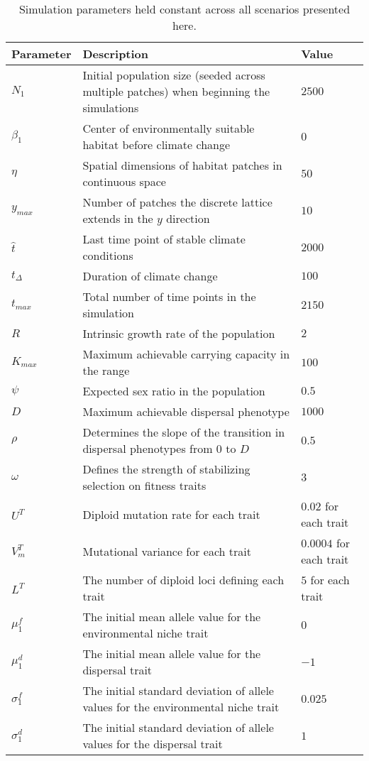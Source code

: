 \documentclass[11pt, oneside]{article}
\begin{document}
\begin{table}
\renewcommand{\arraystretch}{1.5}
  \begin{tabular}{ p{2cm} | p{8cm} | p{2cm} }
    \hline
    Parameter & Description & Value \\ \hline \hline
    $N_{1}$ & Initial population size (seeded across multiple patches) when beginning the simulations & $2500$ \\
    $\beta_{1}$ & Center of environmentally suitable habitat before climate change & $0$ \\
    $\eta$ & Spatial dimensions of habitat patches in continuous space & $50$ \\
    $y_{max}$ & Number of patches the discrete lattice extends in the $y$ direction & $10$ \\
    $\hat{t}$ & Last time point of stable climate conditions & $2000$ \\
    $t_{\Delta}$ & Duration of climate change & $100$ \\
    $t_{max}$ & Total number of time points in the simulation & $2150$ \\
    $R$ & Intrinsic growth rate of the population & $2$ \\
    $K_{max}$ & Maximum achievable carrying capacity in the range & $100$ \\ 
    $\psi$ & Expected sex ratio in the population & $0.5$ \\
    $D$ & Maximum achievable dispersal phenotype & $1000$ \\
    $\rho$ & Determines the slope of the transition in dispersal phenotypes from $0$ to $D$ & $0.5$ \\
    $\omega$ & Defines the strength of stabilizing selection on fitness traits & $3$ \\
    $U^{T}$ & Diploid mutation rate for each trait & $0.02$ for each trait \\
    $V_{m}^{T}$ & Mutational variance for each trait & $0.0004$ for each trait \\
    $L^{T}$ & The number of diploid loci defining each trait & $5$ for each trait \\
    $\mu_{1}^{f}$ & The initial mean allele value for the environmental niche trait & $0$ \\
    $\mu_{1}^{d}$ & The initial mean allele value for the dispersal trait & $-1$ \\
    $\sigma_{1}^{f}$ & The initial standard deviation of allele values for the environmental niche trait & $0.025$ \\
    $\sigma_{1}^{d}$ & The initial standard deviation of allele values for the dispersal trait & $1$ \\
    \hline
  \end{tabular}
\caption[LoF entry]{Simulation parameters held constant across all scenarios presented here.}
\label{table:ConstPars}
\end{table}
\end{document}
